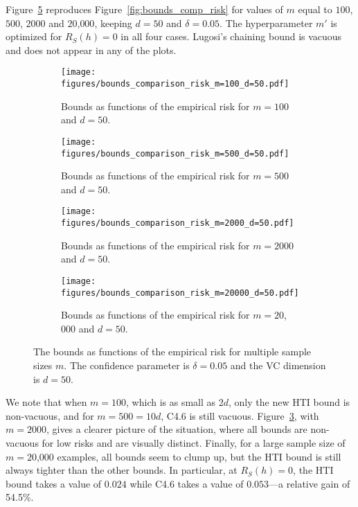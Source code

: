 \documentclass[twoside,11pt]{article}
\begin{document}
Figure~\ref{fig:bounds_comp_risks_app} reproduces Figure~\ref{fig:bounds_comp_risk} for values of $m$ equal to $100$, $500$, $2000$ and $20$,$000$, keeping $d=50$ and $\delta=0.05$.
The hyperparameter $m'$ is optimized for $R_S(h)=0$ in all four cases.
Lugosi's chaining bound is vacuous and does not appear in any of the plots.

\begin{figure}[p]
\centering
\begin{subfigure}[t]{0.485\textwidth}
    \centering
    \texttt{[image: figures/bounds\_comparison\_risk\_m=100\_d=50.pdf]}
    \caption{Bounds as functions of the empirical risk for $m=100$ and $d=50$.}
    \label{fig:bounds_comp_risk_m=100_d=50}
\end{subfigure}\hfill
\begin{subfigure}[t]{0.485\textwidth}
    \centering
    \texttt{[image: figures/bounds\_comparison\_risk\_m=500\_d=50.pdf]}
    \caption{Bounds as functions of the empirical risk for $m=500$ and $d=50$.}
    \label{fig:bounds_comp_risk_m=500_d=50}
\end{subfigure}

\begin{subfigure}[t]{0.485\textwidth}
    \centering
    \texttt{[image: figures/bounds\_comparison\_risk\_m=2000\_d=50.pdf]}
    \caption{Bounds as functions of the empirical risk for $m=2000$ and $d=50$.}
    \label{fig:bounds_comp_risk_m=2000_d=50}
\end{subfigure}\hfill
\begin{subfigure}[t]{0.485\textwidth}
    \centering
    \texttt{[image: figures/bounds\_comparison\_risk\_m=20000\_d=50.pdf]}
    \caption{Bounds as functions of the empirical risk for $m=20$,$000$ and $d=50$.}
    \label{fig:bounds_comp_risk_m=20000_d=50}
\end{subfigure}
\caption{The bounds as functions of the empirical risk for multiple sample sizes $m$.
The confidence parameter is $\delta=0.05$ and the VC dimension is $d=50$.}
\label{fig:bounds_comp_risks_app}
\end{figure}

We note that when $m=100$, which is as small as $2d$, only the new HTI bound is non-vacuous, and for $m=500=10d$, C4.6 is still vacuous.
Figure~\ref{fig:bounds_comp_risk_m=2000_d=50}, with $m=2000$, gives a clearer picture of the situation, where all bounds are non-vacuous for low risks and are visually distinct.
Finally, for a large sample size of $m=20$,$000$ examples, all bounds seem to clump up, but the HTI bound is still always tighter than the other bounds.
In particular, at $R_S(h)=0$, the HTI bound takes a value of $0.024$ while C4.6 takes a value of $0.053$---a relative gain of 54.5\%.
\end{document}
